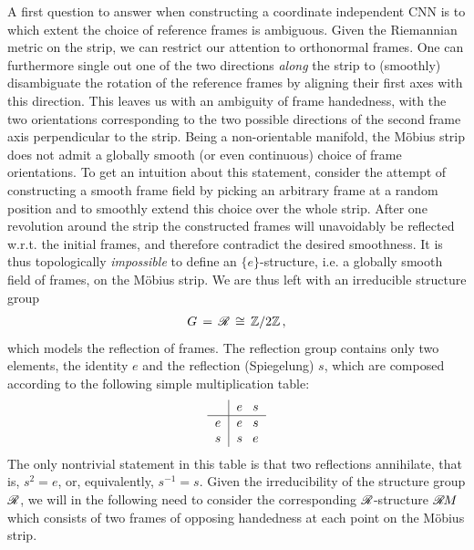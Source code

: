 A first question to answer when constructing a coordinate independent CNN is to which extent the choice of reference frames is ambiguous.
Given the Riemannian metric on the strip, we can restrict our attention to orthonormal frames.
One can furthermore single out one of the two directions \emph{along} the strip to (smoothly) disambiguate the rotation of the reference frames by aligning their first axes with this direction.
This leaves us with an ambiguity of frame handedness, with the two orientations corresponding to the two possible directions of the second frame axis perpendicular to the strip.
Being a non-orientable manifold, the M\"obius strip does not admit a globally smooth (or even continuous) choice of frame orientations.
To get an intuition about this statement, consider the attempt of constructing a smooth frame field by picking an arbitrary frame at a random position and to smoothly extend this choice over the whole strip.
After one revolution around the strip the constructed frames will unavoidably be reflected w.r.t. the initial frames, and therefore contradict the desired smoothness.
It is thus topologically \emph{impossible} to define an $\{e\}$-structure, i.e. a globally smooth field of frames, on the M\"obius strip.
We are thus left with an irreducible structure group
\begin{align}
    G \,=\, \mathscr{R} \,\cong\, \mathbb{Z}/2\mathbb{Z} \,,
\end{align}
which models the reflection of frames.
The reflection group contains only two elements, the identity $e$ and the reflection (Spiegelung) $s$, which are composed according to the following simple multiplication table:
\begin{align}\label{eq:reflection_multiplication_table}
\begin{tabular}{c|c@{\hspace{8pt}}c}
        & $e$ & $s$ \\ \hline
    $e$ & $e$ & $s$ \\
    $s$ & $s$ & $e$
\end{tabular}
\end{align}
The only nontrivial statement in this table is that two reflections annihilate, that is, $s^2=e$, or, equivalently, $s^{-1}=s$.
Given the irreducibility of the structure group $\mathscr{R}$, we will in the following need to consider the corresponding $\mathscr{R}$-structure $\mathscr{R}\mkern-1.8muM$ which consists of two frames of opposing handedness at each point on the M\"obius strip.


